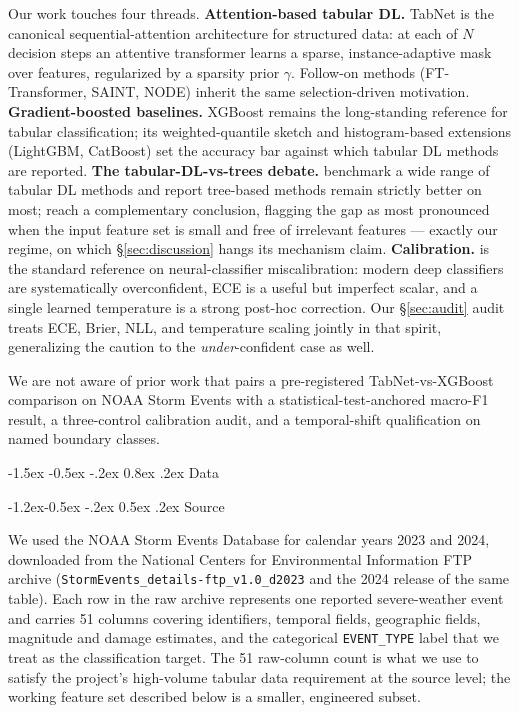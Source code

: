 \documentclass[11pt]{article}
\makeatletter
\renewcommand\section{\@startsection{section}{1}{\z@}%
  {-1.5ex \@plus -0.5ex \@minus -.2ex}%
  {0.8ex \@plus.2ex}%
  {\normalfont\large\bfseries}}
\renewcommand\subsection{\@startsection{subsection}{2}{\z@}%
  {-1.2ex\@plus -0.5ex \@minus -.2ex}%
  {0.5ex \@plus .2ex}%
  {\normalfont\normalsize\bfseries}}
\newcommand{\mF}{macro-F1}
\makeatother
\begin{document}
Our work touches four threads. \textbf{Attention-based tabular DL.}
TabNet \citep{arik2021tabnet} is the canonical
sequential-attention architecture for structured data: at each of
$N$ decision steps an attentive transformer learns a sparse,
instance-adaptive mask over features, regularized by a sparsity
prior $\gamma$. Follow-on methods (FT-Transformer, SAINT, NODE)
inherit the same selection-driven motivation.
\textbf{Gradient-boosted baselines.} XGBoost \citep{chen2016xgboost}
remains the long-standing reference for tabular classification; its
weighted-quantile sketch and histogram-based extensions
(LightGBM, CatBoost) set the accuracy bar against which tabular DL
methods are reported. \textbf{The tabular-DL-vs-trees debate.}
\citet{grinsztajn2022why} benchmark a wide range of tabular DL
methods and report tree-based methods remain strictly better on
most; \citet{shwartz2022tabular} reach a complementary conclusion,
flagging the gap as most pronounced when the input feature set is
small and free of irrelevant features --- exactly our regime, on
which \S\ref{sec:discussion} hangs its mechanism claim.
\textbf{Calibration.} \citet{guo2017calibration} is the standard
reference on neural-classifier miscalibration: modern deep
classifiers are systematically overconfident, ECE is a useful but
imperfect scalar, and a single learned temperature is a strong
post-hoc correction. Our \S\ref{sec:audit} audit treats ECE, Brier,
NLL, and temperature scaling jointly in that spirit, generalizing
the caution to the \emph{under}-confident case as well.

We are not aware of prior work that pairs a pre-registered
TabNet-vs-XGBoost comparison on NOAA Storm Events with a
statistical-test-anchored \mF{} result, a three-control calibration
audit, and a temporal-shift qualification on named boundary classes.

\section{Data}\label{sec:data}

\subsection{Source}

We used the NOAA Storm Events Database for calendar years 2023 and
2024, downloaded from the National Centers for Environmental
Information FTP archive
(\texttt{StormEvents\_details-ftp\_v1.0\_d2023} and the 2024 release
of the same table). Each row in the raw archive represents one
reported severe-weather event and carries 51 columns covering
identifiers, temporal fields, geographic fields, magnitude and
damage estimates, and the categorical \texttt{EVENT\_TYPE} label
that we treat as the classification target. The 51 raw-column count
is what we use to satisfy the project's high-volume tabular data
requirement at the source level; the working feature set described
below is a smaller, engineered subset.
\end{document}
